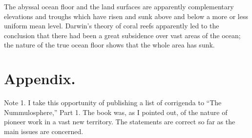 \documentclass[a4paper, 12pt, oneside]{article}
\begin{document}
The abyssal ocean floor and the land surfaces are apparently complementary elevations and troughs which have risen and sunk above and below a more or less uniform mean level. Darwin's theory of coral reefs apparently led to the conclusion that there had been a great subsidence over vast areas of the ocean; the nature of the true ocean floor shows that the whole area has sunk.
\clearpage
\section{Appendix.}
\paragraph{}
Note 1. I take this opportunity of publishing a list of corrigenda to ``The Nummulosphere,'' Part 1. The book was, as I pointed out, of the nature of pioneer work in a vast new territory. The statements are correct so far as the main issues are concerned.
\end{document}
